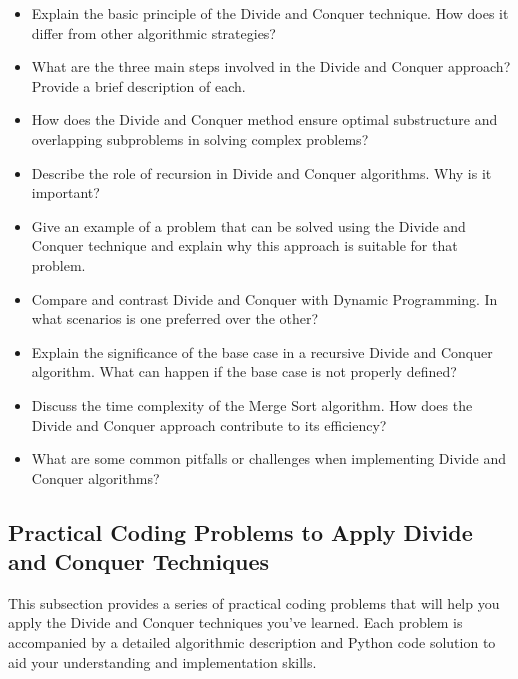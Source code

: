 \documentclass[12pt]{book} %
\begin{document}
\begin{itemize}
    \item Explain the basic principle of the Divide and Conquer technique. How does it differ from other algorithmic strategies?
    \item What are the three main steps involved in the Divide and Conquer approach? Provide a brief description of each.
    \item How does the Divide and Conquer method ensure optimal substructure and overlapping subproblems in solving complex problems?
    \item Describe the role of recursion in Divide and Conquer algorithms. Why is it important?
    \item Give an example of a problem that can be solved using the Divide and Conquer technique and explain why this approach is suitable for that problem.
    \item Compare and contrast Divide and Conquer with Dynamic Programming. In what scenarios is one preferred over the other?
    \item Explain the significance of the base case in a recursive Divide and Conquer algorithm. What can happen if the base case is not properly defined?
    \item Discuss the time complexity of the Merge Sort algorithm. How does the Divide and Conquer approach contribute to its efficiency?
    \item What are some common pitfalls or challenges when implementing Divide and Conquer algorithms?
\end{itemize}

\subsection{Practical Coding Problems to Apply Divide and Conquer Techniques}
This subsection provides a series of practical coding problems that will help you apply the Divide and Conquer techniques you've learned. Each problem is accompanied by a detailed algorithmic description and Python code solution to aid your understanding and implementation skills.
\end{document}
